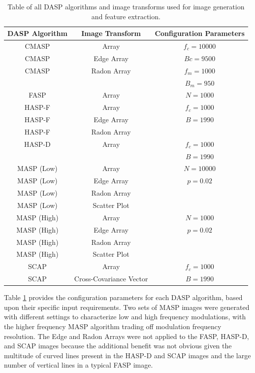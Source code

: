 \begin{table}[tb]
	\caption{Table of all DASP algorithms and image transforms used for image generation and feature extraction.}
	\centering
		\begin{tabular}{cc|c}
		\hline
		DASP Algorithm & Image Transform & Configuration Parameters\\
		\hline
    CMASP & Array & $f_c = 10000$\\
		CMASP & Edge Array & $Bc = 9500$ \\
		CMASP & Radon Array & $f_m = 1000$ \\
		& & $B_m = 950$ \\
		\hline
		FASP & Array & $N = 1000$ \\
		\hline
		HASP-F & Array & $f_c = 1000$ \\
		HASP-F & Edge Array & $B = 1990$ \\
		HASP-F & Radon Array & \\
		\hline
		HASP-D & Array & $f_c = 1000$ \\
		& & $B = 1990$ \\
		\hline
		MASP (Low) & Array & $N = 10000$\\
		MASP (Low) & Edge Array & $p = 0.02$ \\
		MASP (Low) & Radon Array & \\
		MASP (Low) & Scatter Plot &\\
		\hline
		MASP (High) & Array & $N = 1000$ \\
		MASP (High) & Edge Array & $p = 0.02$ \\
		MASP (High) & Radon Array & \\
		MASP (High) & Scatter Plot & \\	
		\hline
		SCAP & Array & $f_c = 1000$ \\
		SCAP & Cross-Covariance Vector & $B = 1990$ \\
    \hline
		\end{tabular}
	\label{tab:dasp_config_parameters}
\end{table}

Table \ref{tab:dasp_config_parameters} provides the configuration parameters for each DASP algorithm, based upon their specific input requirements.  Two sets of MASP images were generated with different settings to characterize low and high frequency modulations, with the higher frequency MASP algorithm trading off modulation frequency resolution.  The Edge and Radon Arrays were not applied to the FASP, HASP-D, and SCAP images because the additional benefit was not obvious given the multitude of curved lines present in the HASP-D and SCAP images and the large number of vertical lines in a typical FASP image.

